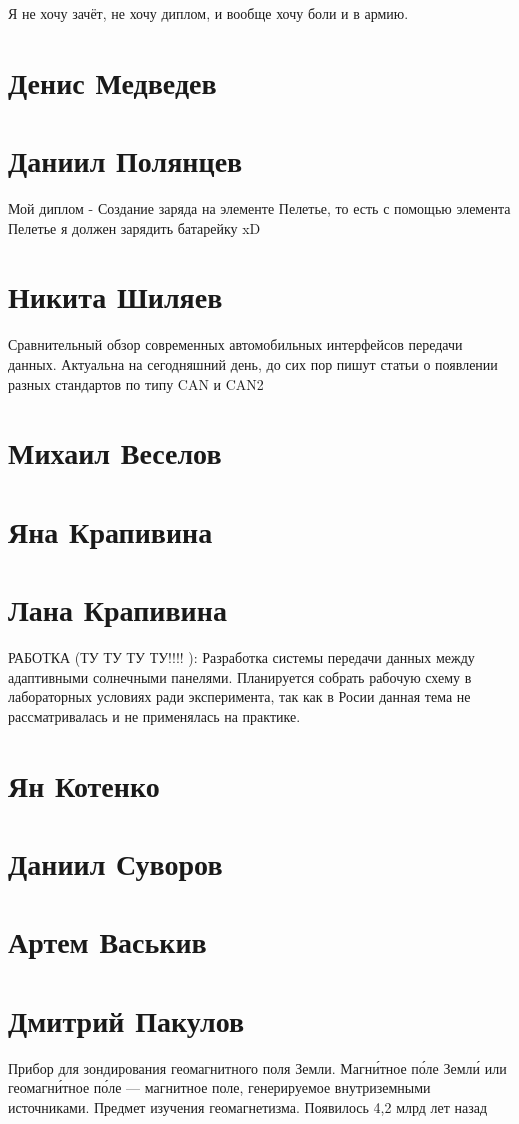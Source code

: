 \documentclass{article}
\begin{document}
Я не хочу зачёт, не хочу диплом, и вообще хочу боли и в армию.
\section*{Денис Медведев}

\section*{Даниил Полянцев}
Мой диплом - Создание заряда на элементе Пелетье, то есть с помощью элемента Пелетье я должен зарядить батарейку xD

\section*{Никита Шиляев}

Сравнительный обзор современных автомобильных интерфейсов передачи данных. Актуальна на сегодняшний день, до сих пор пишут статьи о появлении разных стандартов по типу CAN и CAN2

\section*{Михаил Веселов}

\section*{Яна Крапивина}

\section*{Лана Крапивина}
РАБОТКА (ТУ ТУ ТУ ТУ!!!! ): Разработка системы передачи данных между адаптивными солнечными панелями. Планируется собрать рабочую схему в лабораторных условиях ради эксперимента, так как в Росии данная тема не рассматривалась и не применялась на практике.

\section*{Ян Котенко}

\section*{Даниил Суворов}

\section*{Артем Васькив}

\section*{Дмитрий Пакулов}
Прибор для зондирования геомагнитного поля Земли. Магни́тное по́ле Земли́ или геомагни́тное по́ле — магнитное поле, генерируемое внутриземными источниками. Предмет изучения геомагнетизма. Появилось 4,2 млрд лет назад
\end{document}
